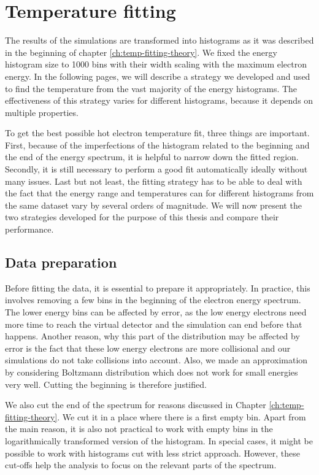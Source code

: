\section{Temperature fitting}
The results of the simulations are transformed into histograms as it was described in the beginning of chapter \ref{ch:temp-fitting-theory}. We fixed the energy histogram size to 1000 bins with their width scaling with the maximum electron energy. In the following pages, we will describe a strategy we developed and used to find the temperature from the vast majority of the energy histograms. The effectiveness of this strategy varies for different histograms, because it depends on multiple properties.

To get the best possible hot electron temperature fit, three things are important. First, because of the imperfections of the histogram related to the beginning and the end of the energy spectrum, it is helpful to narrow down the fitted region. Secondly, it is still necessary to perform a good fit automatically ideally without many issues. Last but not least, the fitting strategy has to be able to deal with the fact that the energy range and temperatures can for different histograms from the same dataset vary by several orders of magnitude. We will now present the two strategies developed for the purpose of this thesis and compare their performance.


\subsection*{Data preparation}
Before fitting the data, it is essential to prepare it appropriately. In practice, this involves removing a few bins in the beginning of the electron energy spectrum. The lower energy bins can be affected by error, as the low energy electrons need more time to reach the virtual detector and the simulation can end before that happens. Another reason, why this part of the distribution may be affected by error is the fact that these low energy electrons are more collisional and our simulations do not take collisions into account. Also, we made an approximation by considering Boltzmann distribution which does not work for small energies very well. Cutting the beginning is therefore justified. 

We also cut the end of the spectrum for reasons discussed in Chapter \ref{ch:temp-fitting-theory}. We cut it in a place where there is a first empty bin. Apart from the main reason, it is also not practical to work with empty bins in the logarithmically transformed version of the histogram. In special cases, it might be possible to work with histograms cut with less strict approach. However, these cut-offs help the analysis to focus on the relevant parts of the spectrum.


